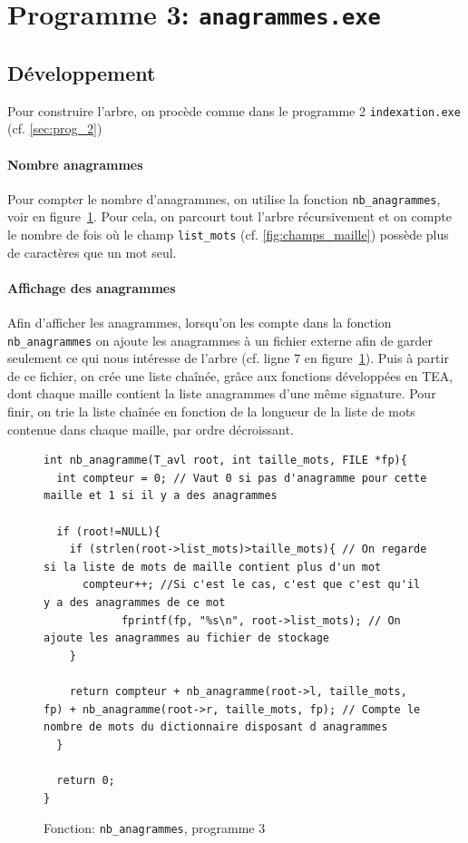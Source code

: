 \documentclass{article} %
\begin{document}
\section{Programme 3: \texttt{anagrammes.exe}}
\subsection{Développement}
Pour construire l'arbre, on procède comme dans le programme 2 \texttt{indexation.exe} (cf. \ref{sec:prog_2})

\paragraph{Nombre anagrammes} Pour compter le nombre d'anagrammes, on utilise la fonction \texttt{nb\_anagrammes}, voir en figure~\ref{fig:nb_anag}. Pour cela, on parcourt tout l'arbre récursivement et on compte le nombre de fois où le champ \texttt{list\_mots} (cf. \ref{fig:champs_maille}) possède plus de caractères que un mot seul. 

\paragraph{Affichage des anagrammes} Afin d'afficher les anagrammes, lorsqu'on les compte dans la fonction \texttt{nb\_anagrammes} on ajoute les anagrammes à un fichier externe afin de garder seulement ce qui nous intéresse de l'arbre (cf. ligne 7 en figure~\ref{fig:nb_anag}). Puis à partir de ce fichier, on crée une liste chaînée, grâce aux fonctions développées en TEA, dont chaque maille contient la liste anagrammes d'une même signature. Pour finir, on trie la liste chaînée en fonction de la longueur de la liste de mots contenue dans chaque maille, par ordre décroissant. 

\begin{figure}[H]
  \begin{lstlisting}
int nb_anagramme(T_avl root, int taille_mots, FILE *fp){
  int compteur = 0; // Vaut 0 si pas d'anagramme pour cette maille et 1 si il y a des anagrammes

  if (root!=NULL){
    if (strlen(root->list_mots)>taille_mots){ // On regarde si la liste de mots de maille contient plus d'un mot
      compteur++; //Si c'est le cas, c'est que c'est qu'il y a des anagrammes de ce mot
            fprintf(fp, "%s\n", root->list_mots); // On ajoute les anagrammes au fichier de stockage
    }

    return compteur + nb_anagramme(root->l, taille_mots, fp) + nb_anagramme(root->r, taille_mots, fp); // Compte le nombre de mots du dictionnaire disposant d anagrammes
  }

  return 0;
}\end{lstlisting}
\caption{Fonction: \texttt{nb\_anagrammes}, programme 3}
\label{fig:nb_anag}
  
\end{figure}
\end{document}
